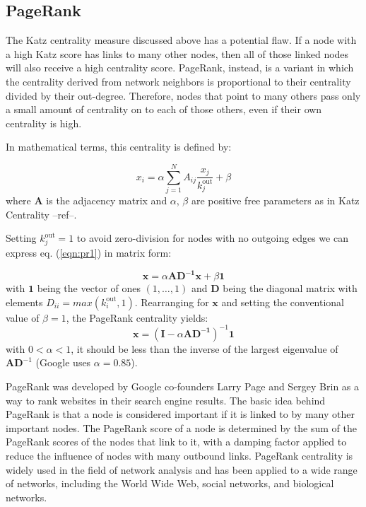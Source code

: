\subsection*{PageRank}

The Katz centrality measure discussed above has a potential flaw. If a node with a high Katz score has links to many other nodes, then all of those linked nodes will also receive a high centrality score. PageRank, instead, is a variant in which the centrality derived from network neighbors is proportional to their centrality divided by their out-degree. Therefore, nodes that point to many others pass only a small amount of centrality on to each of those others, even if their own centrality is high.

In mathematical terms, this centrality is defined by:

\begin{equation}
\label{eqn:pr1}
    x_i= \alpha\sum_{j=1}^{N}A_{ij}\frac{x_j}{k_j^{\text{out}}} + \beta
\end{equation}
where $\mathbf{A}$ is the adjacency matrix and $\alpha$, $\beta$ are positive free parameters as in Katz Centrality --ref--.

Setting $k_j^{\text{out}}=1$ to avoid zero-division for nodes with no outgoing edges we can express eq. (\ref{eqn:pr1}) in matrix form:

\begin{equation}
\label{eqn:pr2}
    \mathbf{x} = \alpha\mathbf{AD^{-1}x} + \beta \mathbf{1}
\end{equation}
with $\mathbf{1}$ being the vector of ones $(1,\dots,1)$ and $\mathbf{D}$ being the diagonal matrix with elements $D_{ii} = max(k_i^{\text{out}},1)$. Rearranging for $\mathbf{x}$ and setting the conventional value of $\beta=1$, the PageRank centrality yields:
\begin{equation}
\label{eqn:pr3}
    \mathbf{x} = (\mathbf{I} - \alpha\mathbf{AD^{-1}})^{-1} \mathbf{1}
\end{equation}
with $0<\alpha<1$, it should be less than the inverse of the largest eigenvalue of $\mathbf{AD}^{-1}$ (Google uses $\alpha = 0.85$).


PageRank was developed by Google co-founders Larry Page and Sergey Brin as a way to rank websites in their search engine results. The basic idea behind PageRank is that a node is considered important if it is linked to by many other important nodes. The PageRank score of a node is determined by the sum of the PageRank scores of the nodes that link to it, with a damping factor applied to reduce the influence of nodes with many outbound links. PageRank centrality is widely used in the field of network analysis and has been applied to a wide range of networks, including the World Wide Web, social networks, and biological networks.


